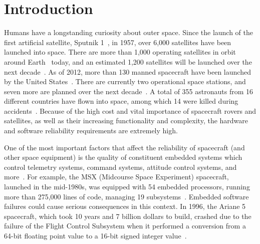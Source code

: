 \section{Introduction}\label{sec:introduction}

Humans have a longstanding curiosity about outer space. Since the launch of the first artificial satellite, Sputnik 1~\cite{sputnik1}, in 1957, over 6,000 satellites have been launched into space. There are more than 1,000 operating satellites in orbit around Earth~\cite{satellite:total} today, and an estimated 1,200 satellites will be launched over the next decade~\cite{satellite:next10years}. As of 2012, more than 130 manned spacecraft have been launched by the United States~\cite{space:shuttle:list}. There are currently two operational space stations, and seven more are planned over the next decade~\cite{space:station:tiangong2}\cite{space:station:almaz}\cite{space:station:opsek}\cite{space:station:tiangong3}. A total of 355 astronauts from 16 different countries have flown into space, among which 14 were killed during accidents~\cite{space:shuttle:numbers}. Because of the high cost and vital importance of spacecraft rovers and satellites, as well as their increasing functionality and complexity, the hardware and software reliability requirements are extremely high.

One of the most important factors that affect the reliability of spacecraft (and other space equipment) is the quality of constituent embedded systems which control telemetry systems, command systems, attitude control systems, and more~\cite[p.654]{fundamentals:space}. For example, the MSX (Midcourse Space Experiment) spacecraft, launched in the mid-1980s, was equipped with 54 embedded processors, running more than 275,000 lines of code, managing 19 subsystems~\cite[p.655]{fundamentals:space}. Embedded software failures could cause serious consequences in this context. In 1996, the Ariane 5 spacecraft, which took 10 years and 7 billion dollars to build, crashed due to the failure of the Flight Control Subsystem when it performed a conversion from a 64-bit floating point value to a 16-bit signed integer value~\cite{ariane5}.


